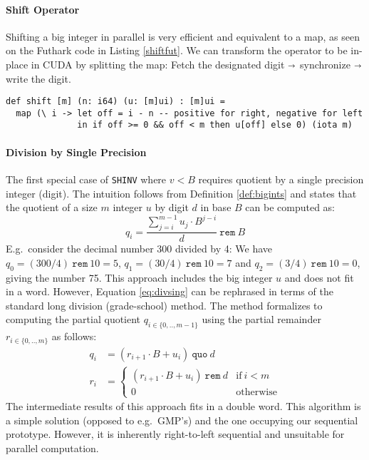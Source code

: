 \bigskip

\paragraph{Shift Operator}
Shifting a big integer in parallel is very efficient and equivalent to a map, as
seen on the Futhark code in Listing \ref{shiftfut}. We can transform the
operator to be in-place in CUDA by splitting the map: Fetch the designated digit
$\shortrightarrow$ synchronize $\shortrightarrow$ write the digit.
\begin{lstlisting}[language=futhark,caption={\footnotesize Shift operator (Definition \ref{def:shifts}) in Futhark from file \texttt{helper.fut}.},firstnumber=96,label={shiftfut}]
def shift [m] (n: i64) (u: [m]ui) : [m]ui =
  map (\ i -> let off = i - n -- positive for right, negative for left
              in if off >= 0 && off < m then u[off] else 0) (iota m)
\end{lstlisting}

\paragraph{Division by Single Precision}
The first special case of \texttt{SHINV} where $v<B$ requires quotient by a
single precision integer (digit). The intuition follows from Definition
\ref{def:bigints} and states that the quotient of a size $m$ integer $u$ by
digit $d$ in base $B$ can be computed as:
\begin{equation}
  \label{eq:divsing}
  q_i = \dfrac{\sum_{j=i}^{m-1} u_j \cdot B^{j-i}}{d}~ \mathtt{rem}~ B
\end{equation}
E.g.\ consider the decimal number 300 divided by 4: We have
$q_0 = (300 / 4)~ \mathtt{rem}~ 10 = 5$, $q_1 = (30 / 4)~ \mathtt{rem}~ 10 = 7$
and $q_2 = (3 / 4)~\mathtt{rem}~10 = 0$, giving the number 75. This approach
includes the big integer $u$ and does not fit in a word. However, Equation
\ref{eq:divsing} can be rephrased in terms of the standard long division
(grade-school) method. The method formalizes to computing the partial quotient
$q_{i\in\{0,..,m-1\}}$ using the partial remainder $r_{i\in\{0,..,m\}}$ as follows:
\begin{align}
  q_i &= \left( r_{i+1} \cdot B + u_i\right)~ \mathtt{quo}~ d\\
  r_i &= \begin{cases} \left( r_{i+1} \cdot B + u_i\right)~ \mathtt{rem}~d & \text{if}~i<m \\ 0 & \text{otherwise} \end{cases}
\end{align}
The intermediate results of this approach fits in a double word. This algorithm
is a simple solution (opposed to e.g.\ GMP's) and the one occupying our
sequential prototype. However, it is inherently right-to-left
sequential and unsuitable for parallel computation.

